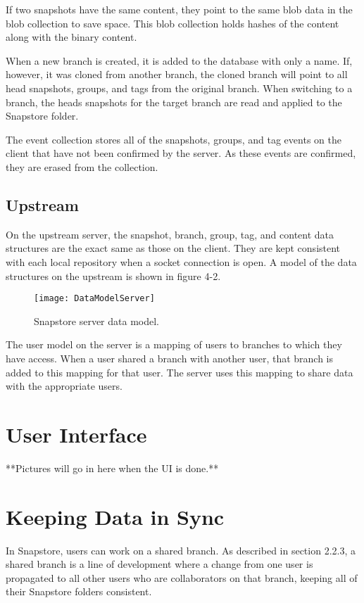 If two snapshots have the same content, they point to the same blob data in the blob collection to save space. This blob collection holds hashes of the content along with the binary content.

When a new branch is created, it is added to the database with only a name. If, however, it was cloned from another branch, the cloned branch will point to all head snapshots, groups, and tags from the original branch. When switching to a branch, the heads snapshots for the target branch are read and applied to the Snapstore folder.

The event collection stores all of the snapshots, groups, and tag events on the client that have not been confirmed by the server. As these events are confirmed, they are erased from the collection.

\subsection{Upstream}

On the upstream server, the snapshot, branch, group, tag, and content data structures are the exact same as those on the client. They are kept consistent with each local repository when a socket connection is open. A model of the data structures on the upstream is shown in figure 4-2.

\begin{figure}
\texttt{[image: DataModelServer]}
\caption{Snapstore server data model.}
\label{arm:fig1}
\end{figure}

The user model on the server is a mapping of users to branches to which they have access. When a user shared a branch with another user, that branch is added to this mapping for that user. The server uses this mapping to share data with the appropriate users.

\section{User Interface}

**Pictures will go in here when the UI is done.**

\section{Keeping Data in Sync}

In Snapstore, users can work on a shared branch. As described in section 2.2.3, a shared branch is a line of development where a change from one user is propagated to all other users who are collaborators on that branch, keeping all of their Snapstore folders consistent.

